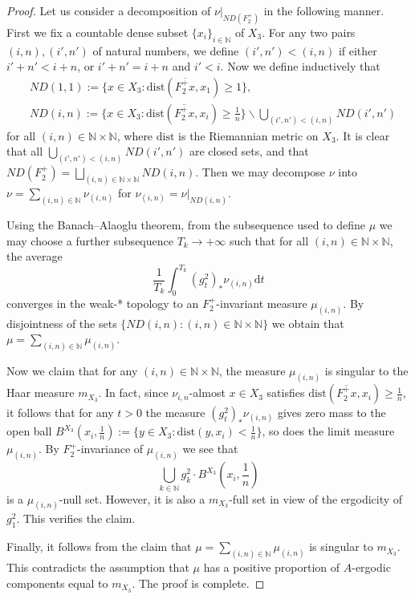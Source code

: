 \documentclass[reqno,12pt]{amsart}
\theoremstyle{definition}
\numberwithin{equation}{section}
\newcommand{\NN}{\mathbb{N}}
\newcommand{\dist}{\mathrm{dist}}
\renewcommand{\setminus}{\smallsetminus}
\begin{document}
{\begin{proof}
Let us consider a decomposition of $\nu|_{ND(F_2^+)}$ in the following manner. First we fix a countable dense subset $\{x_i\}_{i\in\NN}$ of $X_3$. For any two pairs $(i,n),(i',n')$ of natural numbers, we define $(i',n')<(i,n)$ if either $i'+n'<i+n$, or $i'+n'=i+n$ and $i'<i$. Now we define inductively that \begin{equation*}
    \begin{aligned}
        &ND(1,1):=\{x\in X_3:\dist(\overline{F_2^+x},x_1)\geq 1\},\\
        &ND(i,n):=\{x\in X_3:\dist(\overline{F_2^+x},x_i)\geq \frac{1}{n}\}\setminus \bigcup_{(i',n')<(i,n)}ND(i',n')
    \end{aligned}
\end{equation*}
for all $(i,n)\in\NN\times\NN$, where $\dist$ is the Riemannian metric on $X_3$. It is clear that all $\bigcup_{(i',n')<(i,n)}ND(i',n')$ are closed sets, and that $ND(F_2^+)=\bigsqcup_{(i,n)\in\NN\times\NN}ND(i,n)$. Then we may decompose $\nu$ into $\nu=\sum_{(i,n)\in\NN}\nu_{(i,n)}$ for $\nu_{(i,n)}=\nu|_{ND(i,n)}$.

Using {the} Banach--Alaoglu theorem, from the subsequence used to define $\mu$ we may choose a further subsequence $T_k\to +\infty$ such that for all $(i,n)\in\NN\times \NN$, the average \begin{equation*}
    \frac{1}{T_k}\int_0^{T_k}(g^2_t)_*\nu_{(i,n)}\mathrm{d}t
\end{equation*}
converges in the weak-* topology to an $F_2^+$-invariant measure $\mu_{(i,n)}$. By disjointness of the sets $\{ND(i,n):(i,n)\in\NN\times \NN\}$ we obtain that $\mu=\sum_{(i,n)\in\NN}\mu_{(i,n)}$.

    Now we claim that for any $(i,n)\in\NN\times\NN$, the measure $\mu_{(i,n)}$ is singular to the Haar measure $m_{X_3}$. In fact, since $\nu_{i,n}$-almost $x\in X_3$ satisfies $\dist(\overline{F_2^+x},x_i)\geq \frac{1}{n}$, it follows that for any $t>0$ the measure $(g^2_t)_*\nu_{(i,n)}$ gives zero mass to the open ball $B^{X_3}(x_i,\frac{1}{n}):=\{y\in X_3:\dist(y,x_i)<\frac{1}{n}\}$, so does the limit measure $\mu_{(i,n)}$. By $F_2^+$-invariance of $\mu_{(i,n)}$ we see that 
\begin{equation*}
    \bigcup_{k\in\NN} g^2_k\cdot B^{X_3}(x_i,\frac{1}{n})
\end{equation*}
is a $\mu_{(i,n)}$-null set. However, it is also a $m_{X_3}$-full set in view of the ergodicity of $g^2_1$. This verifies the claim.

Finally, it follows from the claim that $\mu=\sum_{(i,n)\in\NN}\mu_{(i,n)}$ is singular to %
$m_{X_3}$. This contradicts the assumption that $\mu$ has a positive proportion of $A$-ergodic components equal to $m_{X_3}$. The proof is complete.
\end{proof}

}
\end{document}
